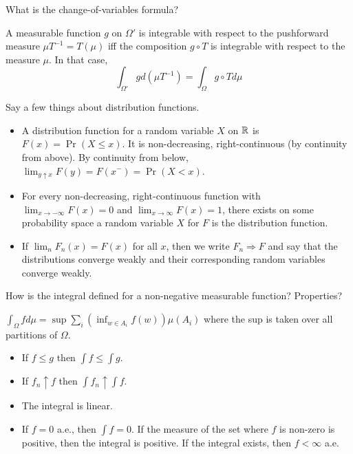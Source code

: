 \documentclass[avery5388,grid,frame]{flashcards}
\begin{document}
\begin{flashcard}
    {What is the change-of-variables formula?}
    \begin{definition}
        A measurable function $g$ on $\Omega'$ is integrable with respect to the pushforward measure $\mu T^{-1} = T(\mu)$ iff the composition $g \circ T$ is integrable with respect to the measure $\mu$. In that case,
        $$\int_{\Omega'} g d(\mu T^{-1}) = \int_{\Omega} g \circ T d\mu$$
    \end{definition}
\end{flashcard}


\begin{flashcard}
    {Say a few things about distribution functions.}
    \begin{properties}
        \begin{itemize}
            \item A distribution function for a random variable $X$ on $\mathbb{R}$ is $F(x) = \Pr(X \leq x)$. It is non-decreasing, right-continuous (by continuity from above). By continuity from below, $\lim_{y \uparrow x} F(y) = F(x^-) = \Pr(X < x)$.
            \item For every non-decreasing, right-continuous function with $\lim_{x \rightarrow -\infty} F(x) = 0$ and $\lim_{x \rightarrow \infty} F(x) = 1$, there exists on some probability space a random variable $X$ for $F$ is the distribution function.
            \item If $\lim_n F_n(x) = F(x)$ for all $x$, then we write $F_n \Rightarrow F$ and say that the distributions converge weakly and their corresponding random variables converge weakly.
        \end{itemize}
    \end{properties}
\end{flashcard}


\begin{flashcard}
    {How is the integral defined for a non-negative measurable function? Properties?}
    \begin{definition}
        $\int_\Omega f d\mu = \sup \sum_i (\inf_{w \in A_i} f(w)) \mu(A_i)$ where the sup is taken over all partitions of $\Omega$.
    \end{definition}

    \begin{properties}
        \begin{itemize}
            \item If $f \leq g$ then $\int f \leq \int g$.
            \item If $f_n \uparrow f$ then $\int f_n \uparrow \int f$.
            \item The integral is linear.
            \item If $f = 0$ a.e., then $\int f = 0$. If the measure of the set where $f$ is non-zero is positive, then the integral is positive. If the integral exists, then $f < \infty$ a.e.
        \end{itemize}
    \end{properties}
\end{flashcard}
\end{document}
